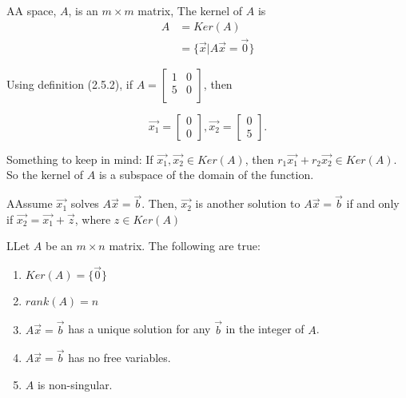   \begin{definition}
    AA space, $A$, is an $m\times m$ matrix, The kernel of $A$ is 
    \begin{align}
      A&=Ker(A)\\
      &=\{\vec{x}|A\vec{x}=\vec{0}\}
    \end{align}
  \end{definition}

  Using definition (2.5.2), if $A=\left[\begin{smallmatrix}1&0\\5&0\\\end{smallmatrix}\right]$, then 

  \begin{equation}
    \vec{x_1}=
    \begin{bmatrix}
      0\\0
    \end{bmatrix}
    , 
    \vec{x_2}=
    \begin{bmatrix}
      0\\5
    \end{bmatrix}.
  \end{equation}

  Something to keep in mind: If $\vec{x_1},\vec{x_2}\in Ker(A)$, then $r_1\vec{x_1}+r_2\vec{x_2}\in Ker(A)$. So the kernel of $A$ is a subspace of the domain of the function.

  \begin{theorem}
    AAssume $\vec{x_1}$ solves $A\vec{x}=\vec{b}$. Then, $\vec{x_2}$ is another solution to $A\vec{x}=\vec{b}$ if and only if $\vec{x_2}=\vec{x_1}+\vec{z}$, where $z\in Ker(A)$
  \end{theorem}

  \begin{proposition}
    LLet $A$ be an $m\times n$ matrix. The following are true:

    \begin{enumerate}
      \item $Ker(A)=\{\vec{0}\}$
      \item $rank(A)=n$
      \item $A\vec{x}=\vec{b}$ has a unique solution for any $\vec{b}$ in the integer of $A$.
      \item $A\vec{x}=\vec{b}$ has no free variables.
      \item $A$ is non-singular.
    \end{enumerate}
  \end{proposition}

